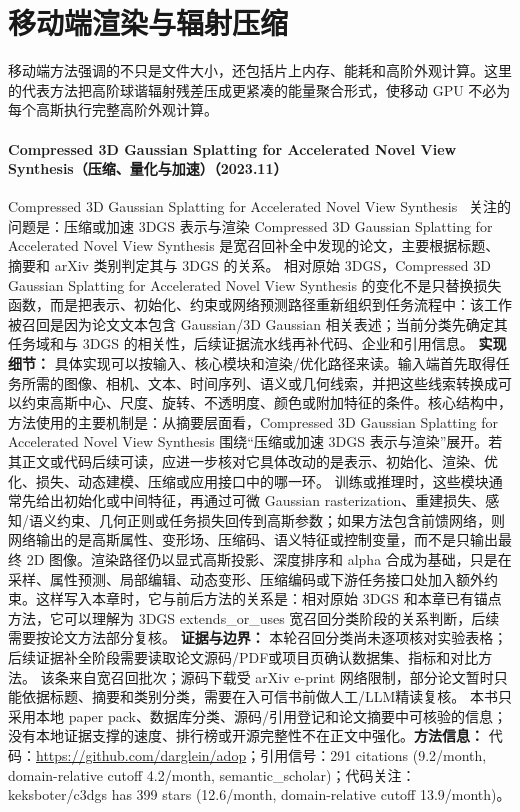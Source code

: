\section{移动端渲染与辐射压缩}

移动端方法强调的不只是文件大小，还包括片上内存、能耗和高阶外观计算。这里的代表方法把高阶球谐辐射残差压成更紧凑的能量聚合形式，使移动 GPU 不必为每个高斯执行完整高阶外观计算。
\paragraph{Compressed 3D Gaussian Splatting for Accelerated Novel View Synthesis（压缩、量化与加速）（2023.11）}
Compressed 3D Gaussian Splatting for Accelerated Novel View Synthesis~\cite{2401_02436} 关注的问题是：压缩或加速 3DGS 表示与渲染 Compressed 3D Gaussian Splatting for Accelerated Novel View Synthesis 是宽召回补全中发现的论文，主要根据标题、摘要和 arXiv 类别判定其与 3DGS 的关系。
相对原始 3DGS，Compressed 3D Gaussian Splatting for Accelerated Novel View Synthesis 的变化不是只替换损失函数，而是把表示、初始化、约束或网络预测路径重新组织到任务流程中：该工作被召回是因为论文文本包含 Gaussian/3D Gaussian 相关表述；当前分类先确定其任务域和与 3DGS 的相关性，后续证据流水线再补代码、企业和引用信息。
\textbf{实现细节：} 具体实现可以按输入、核心模块和渲染/优化路径来读。输入端首先取得任务所需的图像、相机、文本、时间序列、语义或几何线索，并把这些线索转换成可以约束高斯中心、尺度、旋转、不透明度、颜色或附加特征的条件。核心结构中，方法使用的主要机制是：从摘要层面看，Compressed 3D Gaussian Splatting for Accelerated Novel View Synthesis 围绕“压缩或加速 3DGS 表示与渲染”展开。若其正文或代码后续可读，应进一步核对它具体改动的是表示、初始化、渲染、优化、损失、动态建模、压缩或应用接口中的哪一环。 训练或推理时，这些模块通常先给出初始化或中间特征，再通过可微 Gaussian rasterization、重建损失、感知/语义约束、几何正则或任务损失回传到高斯参数；如果方法包含前馈网络，则网络输出的是高斯属性、变形场、压缩码、语义特征或控制变量，而不是只输出最终 2D 图像。渲染路径仍以显式高斯投影、深度排序和 alpha 合成为基础，只是在采样、属性预测、局部编辑、动态变形、压缩编码或下游任务接口处加入额外约束。这样写入本章时，它与前后方法的关系是：相对原始 3DGS 和本章已有锚点方法，它可以理解为 3DGS extends\_or\_uses 宽召回分类阶段的关系判断，后续需要按论文方法部分复核。
\textbf{证据与边界：} 本轮召回分类尚未逐项核对实验表格；后续证据补全阶段需要读取论文源码/PDF或项目页确认数据集、指标和对比方法。 该条来自宽召回批次；源码下载受 arXiv e-print 网络限制，部分论文暂时只能依据标题、摘要和类别分类，需要在入可信书前做人工/LLM精读复核。 本书只采用本地 paper pack、数据库分类、源码/引用登记和论文摘要中可核验的信息；没有本地证据支撑的速度、排行榜或开源完整性不在正文中强化。\textbf{方法信息：} 代码：\url{https://github.com/darglein/adop}；引用信号：291 citations (9.2/month, domain-relative cutoff 4.2/month, semantic\_scholar)；代码关注：keksboter/c3dgs has 399 stars (12.6/month, domain-relative cutoff 13.9/month)。
